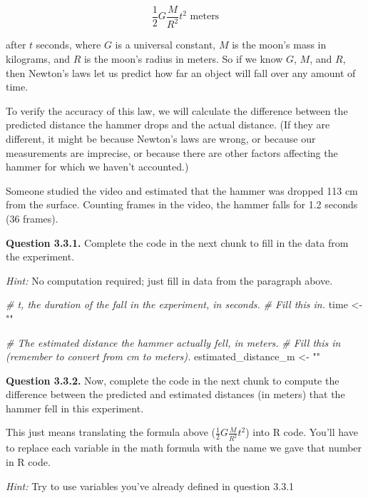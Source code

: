\documentclass[
]{article}
\newenvironment{Shaded}{\begin{snugshade}}{\end{snugshade}}
\newcommand{\CommentTok}[1]{\textcolor[rgb]{0.56,0.35,0.01}{\textit{#1}}}
\newcommand{\NormalTok}[1]{#1}
\newcommand{\OtherTok}[1]{\textcolor[rgb]{0.56,0.35,0.01}{#1}}
\newcommand{\StringTok}[1]{\textcolor[rgb]{0.31,0.60,0.02}{#1}}
\begin{document}
\[\frac{1}{2} G \frac{M}{R^2} t^2 \text{ meters}\]

after \(t\) seconds, where \(G\) is a universal constant, \(M\) is the
moon's mass in kilograms, and \(R\) is the moon's radius in meters. So
if we know \(G\), \(M\), and \(R\), then Newton's laws let us predict
how far an object will fall over any amount of time.

To verify the accuracy of this law, we will calculate the difference
between the predicted distance the hammer drops and the actual distance.
(If they are different, it might be because Newton's laws are wrong, or
because our measurements are imprecise, or because there are other
factors affecting the hammer for which we haven't accounted.)

Someone studied the video and estimated that the hammer was dropped 113
cm from the surface. Counting frames in the video, the hammer falls for
1.2 seconds (36 frames).

\textbf{Question 3.3.1.} Complete the code in the next chunk to fill in
the data from the experiment.

\emph{Hint:} No computation required; just fill in data from the
paragraph above.

\begin{Shaded}
\begin{Highlighting}[]
\CommentTok{\# t, the duration of the fall in the experiment, in seconds.}
\CommentTok{\# Fill this in.}
\NormalTok{time }\OtherTok{\textless{}{-}} \StringTok{""}

\CommentTok{\# The estimated distance the hammer actually fell, in meters.}
\CommentTok{\# Fill this in (remember to convert from cm to meters).}
\NormalTok{estimated\_distance\_m }\OtherTok{\textless{}{-}} \StringTok{""}
\end{Highlighting}
\end{Shaded}

\textbf{Question 3.3.2.} Now, complete the code in the next chunk to
compute the difference between the predicted and estimated distances (in
meters) that the hammer fell in this experiment.

This just means translating the formula above
(\(\frac{1}{2}G\frac{M}{R^2}t^2\)) into R code. You'll have to replace
each variable in the math formula with the name we gave that number in R
code.

\emph{Hint:} Try to use variables you've already defined in question
3.3.1
\end{document}
